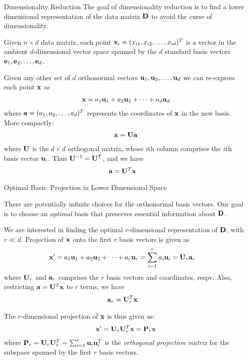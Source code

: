 
\date{Chapter 7: Dimensionality Reduction}

\begin{frame}
\titlepage
\end{frame}


\begin{frame}{Dimensionality Reduction}
  The goal of dimensionality reduction is to find a lower dimensional
  representation of the data matrix $\mathbf{D}$ to avoid the curse
  of dimensionality.

\medskip
Given $n \times d$ data matrix, 
each
point $\mathbf{x}_i =
(x_{i1}, x_{i2}, \ldots, x_{id})^T$ is a vector in the
ambient
$d$-dimensional vector space spanned by the $d$ standard basis
vectors $\mathbf{e}_1, \mathbf{e}_2, \ldots, \mathbf{e}_d$.

\medskip
Given any other set of $d$
orthonormal vectors $\mathbf{u}_1, \mathbf{u}_2, \ldots, \mathbf{u}_d$
we can
re-express each point $\mathbf{x}$ as
\begin{align*}
    \mathbf{x} = a_1 \mathbf{u}_1 + a_2 \mathbf{u}_2 + \cdots + a_d \mathbf{u}_d
\end{align*}
where $\mathbf{a} = (a_1, a_2, \ldots, a_d)^T$ represents the
coordinates of $\mathbf{x}$ in the new basis. 
More compactly:
\begin{align*}
    \mathbf{x} = \mathbf{U} \mathbf{a}
\end{align*}
where $\mathbf{U}$ is the $d \times d$ orthogonal matrix, 
whose $i$th column comprises the $i$th basis vector $\mathbf{u}_i$.
Thus $\mathbf{U}^{-1} = \mathbf{U}^T$, and we have
\begin{align*}
    \mathbf{a} &= \mathbf{U}^T \mathbf{x}
\end{align*}
\end{frame}
%


\begin{frame}{Optimal Basis: Projection in Lower Dimensional Space}

There are potentially inf\/{i}nite choices for the
 orthonormal
basis vectors. Our goal is to choose an 
{\em optimal} basis that preserves essential information about $\mathbf{D}$.

\medskip
We are interested in f\/{i}nding the
optimal $r$-dimensional representation
of $\mathbf{D}$, with $r \ll d$.
Projection of $\mathbf{x}$ onto the f\/{i}rst $r$
basis vectors is given as
\begin{align*}
    \mathbf{x}' & = a_1 \mathbf{u}_1 + a_2 \mathbf{u}_2 + \cdots + a_r \mathbf{u}_r =
    \sum_{i=1}^r a_i \mathbf{u}_i
	= \mathbf{U}_r \mathbf{a}_r
\end{align*}
where $\mathbf{U}_r$ and $\mathbf{a}_r$ comprises the $r$ basis vectors and
coordinates, respv. 
Also, restricting $\mathbf{a} = \mathbf{U}^T \mathbf{x}$ to $r$ terms, we have
\begin{align*}	
\mathbf{a}_r & = \mathbf{U}_r^T \mathbf{x}
\end{align*}


\medskip
The $r$-dimensional projection of $\mathbf{x}$ is thus given as:
\begin{align*}
    \mathbf{x}' = \mathbf{U}_r\mathbf{U}_r^T \mathbf{x} = \mathbf{P}_r \mathbf{x}
\end{align*}
where $\mathbf{P}_r = \mathbf{U}_r \mathbf{U}_r^T = \sum_{i=1}^r \mathbf{u}_i \mathbf{u}_i^T$ is the {\em
orthogonal projection
matrix} for the subspace spanned by the f\/{i}rst $r$ basis vectors.

\end{frame}


